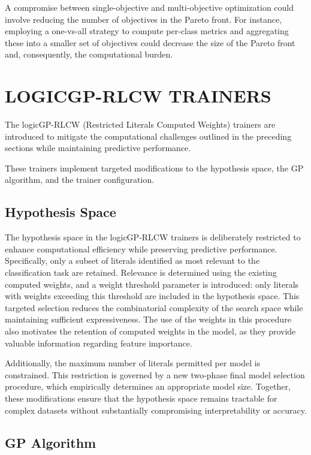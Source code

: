 \documentclass[a4paper,twoside]{article}
\begin{document}
A compromise between single-objective and multi-objective optimization could involve reducing the number of objectives in the Pareto front. For instance, employing a one-vs-all strategy to compute per-class metrics and aggregating these into a smaller set of objectives could decrease the size of the Pareto front and, consequently, the computational burden.


\section{\uppercase{logicGP-RLCW Trainers}}\label{sec:trainers}

The logicGP-RLCW (Restricted Literals Computed Weights) trainers are introduced to mitigate the computational challenges outlined in the preceding sections while maintaining predictive performance.

These trainers implement targeted modifications to the hypothesis space, the GP algorithm, and the trainer configuration.

\subsection{Hypothesis Space}

The hypothesis space in the logicGP-RLCW trainers is deliberately restricted to enhance computational efficiency while preserving predictive performance. Specifically, only a subset of literals identified as most relevant to the classification task are retained. Relevance is determined using the existing computed weights, and a weight threshold parameter is introduced: only literals with weights exceeding this threshold are included in the hypothesis space. This targeted selection reduces the combinatorial complexity of the search space while maintaining sufficient expressiveness. The use of the weights in this procedure also motivates the retention of computed weights in the model, as they provide valuable information regarding feature importance.

Additionally, the maximum number of literals permitted per model is constrained. This restriction is governed by a new two-phase final model selection procedure, which empirically determines an appropriate model size. Together, these modifications ensure that the hypothesis space remains tractable for complex datasets without substantially compromising interpretability or accuracy.

\subsection{GP Algorithm}
\end{document}
